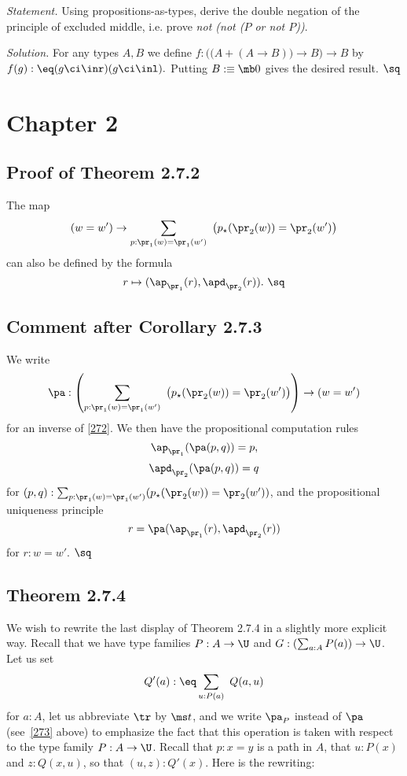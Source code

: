 \documentclass[12pt]{article}
\begin{document}
\emph{Statement.} Using propositions-as-types, derive the double negation of the principle of excluded middle, i.e. prove \emph{not (not ($P$ or not $P$))}.

\nn\emph{Solution.} For any types $A,B$ we define $f:\Big(\big(A+(A\to B)\big)\to B\Big)\to B$ by $f(g):\eq(g\ci\inr)(g\ci\inl).$ Putting $B:\equiv\mb0$ gives the desired result. $\sq$


\section{Chapter 2}

\subsection{Proof of Theorem 2.7.2}

The map 
\begin{equation}\label{272}
(w=w')\to\sum_{p:\pr_1(w)=\pr_1(w')}\ \big(p_\star(\pr_2(w))=\pr_2(w')\big)
\end{equation}
can also be defined by the formula 
$$
r\mapsto(\ap_{\pr_1}(r),\apd_{\pr_2}(r)).\ \sq
$$ 


\subsection{Comment after Corollary 2.7.3}

We write 
\begin{equation}\label{273}
\pa:\left(\sum_{p:\pr_1(w)=\pr_1(w')}\ \big(p_\star(\pr_2(w))=\pr_2(w')\big)\right)\to(w=w')
\end{equation} 
for an inverse of \eqref{272}. We then have the propositional computation rules 
$$
\ap_{\pr_1}(\pa(p,q))=p,
$$
$$
\apd_{\pr_2}(\pa(p,q))=q
$$
for $(p,q):\sum_{p:\pr_1(w)=\pr_1(w')}(p_\star(\pr_2(w))=\pr_2(w'))$, and the propositional uniqueness principle 
$$
r=\pa(\ap_{\pr_1}(r),\apd_{\pr_2}(r))
$$ 
for $r:w=w'$. $\sq$


\subsection{Theorem 2.7.4}\label{274}

We wish to rewrite the last display of Theorem 2.7.4 in a slightly more explicit way. Recall that we have type families $P:A\to\U$ and $G:(\sum_{a:A}P(a))\to\U$. Let us set 
$$
Q'(a):\eq\sum_{u:P(a)}\ Q(a,u)
$$ 
for $a:A$, let us abbreviate $\tr$ by $\ms t$, and we write $\pa_P$ instead of $\pa$ (see~\eqref{273} above) to emphasize the fact that this operation is taken with respect to the type family $P:A\to\U$. Recall that $p:x=y$ is a path in $A$, that $u:P(x)$ and $z:Q(x,u)$, so that $(u,z):Q'(x)$. Here is the rewriting:
\end{document}
